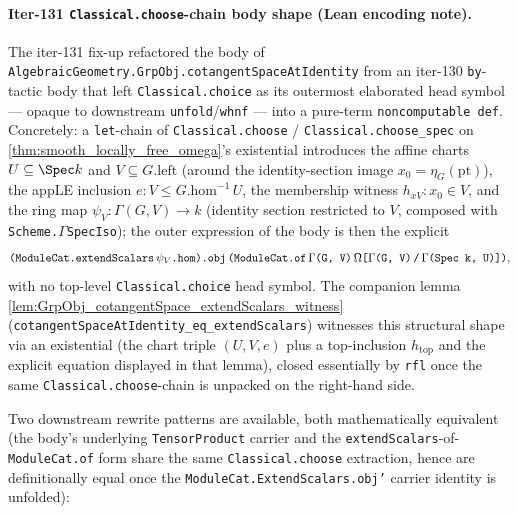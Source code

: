 \paragraph{Iter-131 \texttt{Classical.choose}-chain body shape (Lean encoding note).} The iter-131 fix-up refactored the body of \texttt{AlgebraicGeometry.GrpObj.cotangentSpaceAtIdentity} from an iter-130 \texttt{by}-tactic body that left \texttt{Classical.choice} as its outermost elaborated head symbol — opaque to downstream \texttt{unfold}/\texttt{whnf} — into a pure-term \texttt{noncomputable def}. Concretely: a \texttt{let}-chain of \texttt{Classical.choose} / \texttt{Classical.choose\_spec} on \cref{thm:smooth_locally_free_omega}'s existential introduces the affine charts \(U \subseteq \Spec k\) and \(V \subseteq G.\mathrm{left}\) (around the identity-section image \(x_0 = \eta_G(\mathrm{pt})\)), the appLE inclusion \(e : V \leq G.\mathrm{hom}^{-1}\,U\), the membership witness \(h_{xV} : x_0 \in V\), and the ring map \(\psi_V : \Gamma(G, V) \to k\) (identity section restricted to \(V\), composed with \texttt{Scheme.\(\Gamma\)SpecIso}); the outer expression of the body is then the explicit
\[
  \texttt{(ModuleCat.extendScalars\,\(\psi_V\).hom).obj\,(ModuleCat.of\,\(\Gamma\)(G, V)\,\(\Omega\)[\(\Gamma\)(G, V)\,/\,\(\Gamma\)(Spec k, U)])},
\]
with no top-level \texttt{Classical.choice} head symbol. The companion lemma \cref{lem:GrpObj_cotangentSpace_extendScalars_witness} (\texttt{cotangentSpaceAtIdentity\_eq\_extendScalars}) witnesses this structural shape via an existential (the chart triple \((U, V, e)\) plus a top-inclusion \(h_{\mathrm{top}}\) and the explicit equation displayed in that lemma), closed essentially by \texttt{rfl} once the same \texttt{Classical.choose}-chain is unpacked on the right-hand side.

Two downstream rewrite patterns are available, both mathematically equivalent (the body's underlying \texttt{TensorProduct} carrier and the \texttt{extendScalars}-of-\texttt{ModuleCat.of} form share the same \texttt{Classical.choose} extraction, hence are definitionally equal once the \texttt{ModuleCat.ExtendScalars.obj'} carrier identity is unfolded):

